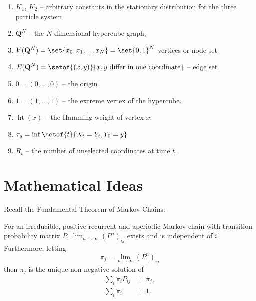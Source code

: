 \documentclass[12pt]{article}
\begin{document}
\begin{enumerate}
    \item
        \( K_1 \), \( K_2 \) -- arbitrary constants in the stationary
        distribution for the three particle system
    \item
        \( \mathbf{Q}^N \) -- the \( N \)-dimensional hypercube graph,
    \item
        \( V(\mathbf{Q}^N) = \set{x_0, x_1, \dots x_N} = \set{0,1}^N \)
        vertices or node set
    \item
        \( E(\mathbf{Q}^N) = \setof{(x,y)}{x, y \text{ differ in one
        coordinate}} \) -- edge set
    \item
        \( \bar{0} = (0, \dots, 0) \) -- the origin
    \item
        \( \bar{1} = (1, \dots, 1) \) -- the extreme vertex of the
        hypercube.
    \item
        \(
        \operatorname{ht}
        (x) \) -- the Hamming weight of vertex \( x \).
    \item
        \( \tau_y = \inf \setof{t} {X_t = Y_t, Y_0 = y} \)
    \item
        \( R_t \) -- the number of unselected coordinates at time \( t \).
\end{enumerate}

\section*{Mathematical Ideas}

Recall the Fundamental Theorem of Markov Chains:

\begin{theorem}
    For an irreducible, positive recurrent and aperiodic Markov chain
    with transition probability matrix \( P \), \( \lim_{n \to \infty} (P^n)_
    {ij} \) exists and is independent of \( i \). Furthermore, letting
    \[
        \pi_j = \lim_{n \to \infty} (P^n)_{ij}
    \] then \( \pi_j \) is the unique non-negative solution of
    \begin{align}
        \sum\limits_{i} \pi_{i} P_{ij} &= \pi_{j},%
        \label{eq:convergencestationary:FTMC1}\\
        \sum\limits_{i} \pi_{i} &= 1.%
        \label{eq:convergencestationary:FTMC2}
    \end{align}
\end{theorem}
\end{document}
